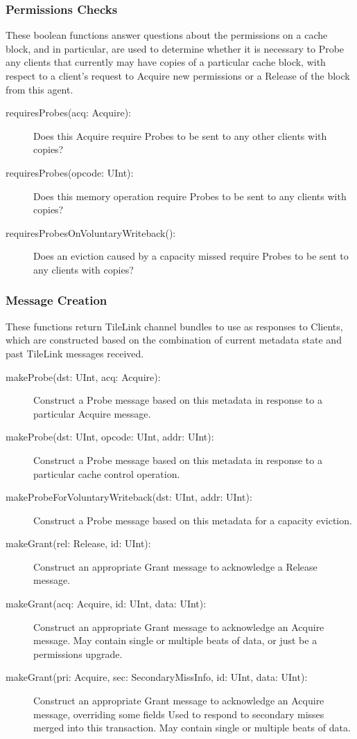 \subsubsection{Permissions Checks}

These boolean functions answer questions about the permissions on a cache block,
and in particular, are used to determine whether it is necessary to Probe any
clients that currently may have copies of a particular cache block,
with respect to a client's request to Acquire new permissions or a
Release of the block from this agent.

\begin{description}
\item[requiresProbes(acq: Acquire):]
Does this Acquire require Probes to be sent to any other clients with copies?
\item[requiresProbes(opcode: UInt):]
Does this memory operation require Probes to be sent to any clients with copies?
\item[requiresProbesOnVoluntaryWriteback():]
Does an eviction caused by a capacity missed require Probes to be sent to any clients with copies?
\end{description}

\subsubsection{Message Creation}

These functions return TileLink channel bundles to use as responses to Clients,
which are constructed  based on the combination of current metadata state and 
past TileLink messages received.

\begin{description}
\item[makeProbe(dst: UInt, acq: Acquire):]
Construct a Probe message based on this metadata in response to a particular Acquire message.
\item[makeProbe(dst: UInt, opcode: UInt, addr: UInt):]
Construct a Probe message  based on this metadata in response to a particular cache control operation.
\item[makeProbeForVoluntaryWriteback(dst: UInt, addr: UInt):]
Construct a Probe message based on this metadata for a capacity eviction.
\item[makeGrant(rel: Release, id: UInt):]
Construct an appropriate Grant message to acknowledge a Release message.
\item[makeGrant(acq: Acquire, id: UInt, data: UInt):]
Construct an appropriate Grant message to acknowledge an Acquire message.
May contain single or multiple beats of data, or just be a permissions upgrade.
\item[makeGrant(pri: Acquire, sec: SecondaryMissInfo, id: UInt, data: UInt):]
Construct an appropriate Grant message to acknowledge an Acquire message, overriding some fields
Used to respond to secondary misses merged into this transaction.
May contain single or multiple beats of data.
\end{description}

